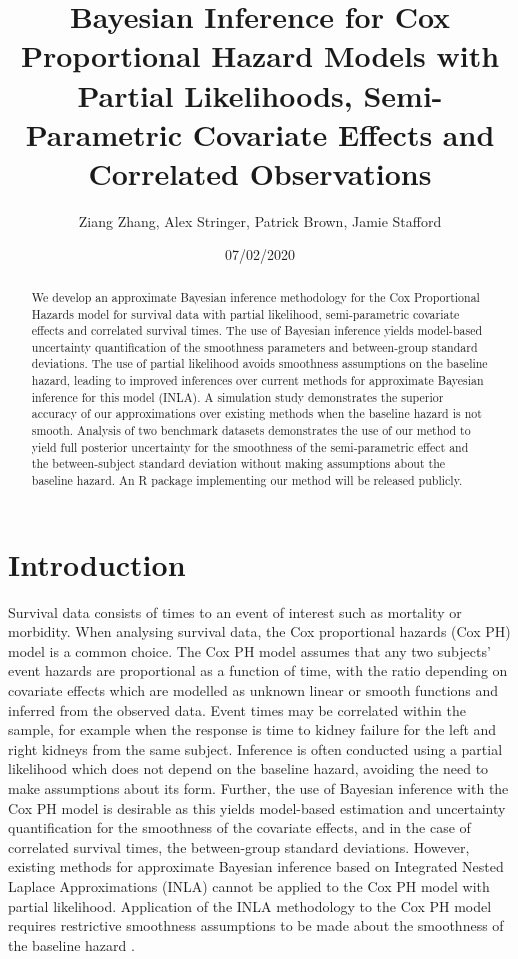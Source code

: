 \documentclass[]{article}
\title{{\myfont Bayesian Inference for Cox Proportional Hazard Models with Partial Likelihoods, Semi-Parametric Covariate Effects and Correlated Observations}}
\date{07/02/2020}
\author{Ziang Zhang, Alex Stringer, Patrick Brown, Jamie Stafford}
\begin{document}
	
\maketitle

\begin{abstract}
We develop an approximate Bayesian inference methodology for the Cox Proportional Hazards model for survival data with partial likelihood, semi-parametric covariate effects and correlated survival times. The use of Bayesian inference yields model-based uncertainty quantification of the smoothness parameters and between-group standard deviations. The use of partial likelihood avoids smoothness assumptions on the baseline hazard, leading to improved inferences over current methods for approximate Bayesian inference for this model (INLA). A simulation study demonstrates the superior accuracy of our approximations over existing methods when the baseline hazard is not smooth. Analysis of two benchmark datasets demonstrates the use of our method to yield full posterior uncertainty for the smoothness of the semi-parametric effect and the between-subject standard deviation without making assumptions about the baseline hazard. An R package implementing our method will be released publicly.
\end{abstract}


\section{Introduction}
Survival data consists of times to an event of interest such as mortality or morbidity.  When analysing survival data, the Cox proportional hazards (Cox PH) model is a common choice. The Cox PH model assumes that any two subjects' event hazards are proportional as a function of time, with the ratio depending on covariate effects which are modelled as unknown linear or smooth functions and inferred from the observed data. Event times may be correlated within the sample, for example when the response is time to kidney failure for the left and right kidneys from the same subject. Inference is often conducted using a partial likelihood which does not depend on the baseline hazard, avoiding the need to make assumptions about its form. Further, the use of Bayesian inference with the Cox PH model is desirable as this yields model-based estimation and uncertainty quantification for the smoothness of the covariate effects, and in the case of correlated survival times, the between-group standard deviations. However, existing methods for approximate Bayesian inference based on Integrated Nested Laplace Approximations (INLA) \citet{inla} cannot be applied to the Cox PH model with partial likelihood. Application of the INLA methodology to the Cox PH model requires restrictive smoothness assumptions to be made about the smoothness of the baseline hazard \citep{inlacoxph}.
\end{document}
